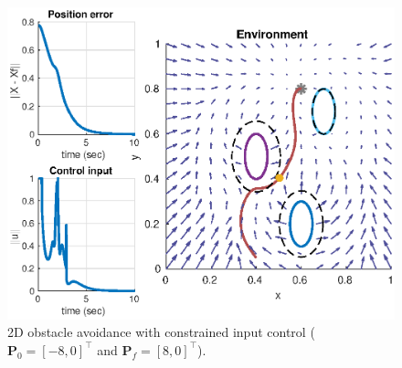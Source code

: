 \begin{figure}[H]
  \centering
  \includegraphics[width=1\linewidth]{img/constrainedinput.eps}
  \caption{2D obstacle avoidance with constrained input control ($\bm{P}_0 = [-8,0]^\top$ and $\bm{P}_f = [8,0]^\top$).}
  \label{fig:constrainedinput}
\end{figure}


